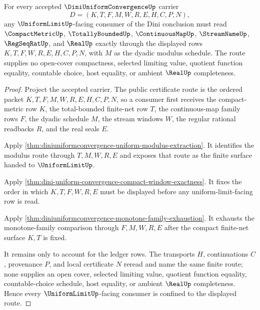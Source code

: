 \begin{theorem}
\label{thm:diniuniformconvergence-compact-uniform-limit-route}
For every accepted $\DiniUniformConvergenceUp$ carrier
$$
D=(K,T,F,M,W,R,E,H,C,P,N),
$$
any $\UniformLimitUp$-facing consumer of the Dini conclusion must read $\CompactMetricUp$, $\TotallyBoundedUp$, $\ContinuousMapUp$, $\StreamNameUp$, $\RegSeqRatUp$, and $\RealUp$ exactly through the displayed rows $K,T,F,W,R,E,H,C,P,N$, with $M$ as the dyadic modulus schedule. The route supplies no open-cover compactness, selected limiting value, quotient function equality, countable choice, host equality, or ambient $\RealUp$ completeness.
\end{theorem}
\begin{proof}
Project the accepted carrier. The public certificate route is the ordered packet $K,T,F,M,W,R,E,H,C,P,N$, so a consumer first receives the compact-metric row $K$, the total-bounded finite-net row $T$, the continuous-map family rows $F$, the dyadic schedule $M$, the stream windows $W$, the regular rational readbacks $R$, and the real seals $E$.

Apply \autoref{thm:diniuniformconvergence-uniform-modulus-extraction}. It identifies the modulus route through $T,M,W,R,E$ and exposes that route as the finite surface handed to $\UniformLimitUp$.

Apply \autoref{thm:dini-uniform-convergence-compact-window-exactness}. It fixes the order in which $K,T,F,W,R,E$ must be displayed before any uniform-limit-facing row is read.

Apply \autoref{thm:diniuniformconvergence-monotone-family-exhaustion}. It exhausts the monotone-family comparison through $F,M,W,R,E$ after the compact finite-net surface $K,T$ is fixed.

It remains only to account for the ledger rows. The transports $H$, continuations $C$, provenance $P$, and local certificate $N$ reread and name the same finite route; none supplies an open cover, selected limiting value, quotient function equality, countable-choice schedule, host equality, or ambient $\RealUp$ completeness. Hence every $\UniformLimitUp$-facing consumer is confined to the displayed route.
\end{proof}


